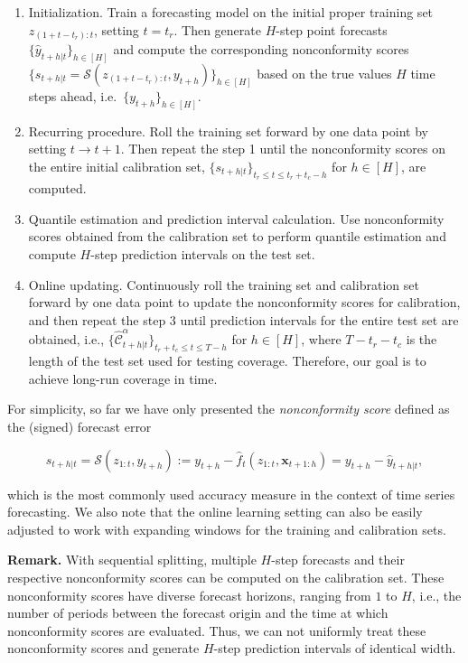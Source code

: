 \documentclass[
  11pt,
  a4paper,
]{article}
\theoremstyle{plain}
\theoremstyle{remark}
\begin{document}
\begin{enumerate}
\def\labelenumi{\arabic{enumi}.}
\item
  Initialization. Train a forecasting model on the initial proper
  training set \(z_{(1+t-t_r):t}\), setting \(t=t_r\). Then generate
  \(H\)-step point forecasts \(\{\hat{y}_{t+h|t}\}_{h\in[H]}\) and
  compute the corresponding nonconformity scores
  \(\{s_{t+h|t}=\mathcal{S}(z_{(1+t-t_r):t}, y_{t+h})\}_{h\in[H]}\)
  based on the true values \(H\) time steps ahead,
  i.e.~\(\{y_{t+h}\}_{h\in[H]}\).
\item
  Recurring procedure. Roll the training set forward by one data point
  by setting \(t \rightarrow t+1\). Then repeat the step 1 until the
  nonconformity scores on the entire initial calibration set,
  \(\{s_{t+h|t}\}_{t_r \leq t \leq t_r+t_c-h}\) for \(h\in[H]\), are
  computed.
\item
  Quantile estimation and prediction interval calculation. Use
  nonconformity scores obtained from the calibration set to perform
  quantile estimation and compute \(H\)-step prediction intervals on the
  test set.
\item
  Online updating. Continuously roll the training set and calibration
  set forward by one data point to update the nonconformity scores for
  calibration, and then repeat the step 3 until prediction intervals for
  the entire test set are obtained, i.e.,
  \(\{\hat{\mathcal{C}}_{t+h|t}^{\alpha}\}_{t_r+t_c \leq t \leq T-h}\)
  for \(h \in [H]\), where \(T-t_r-t_c\) is the length of the test set
  used for testing coverage. Therefore, our goal is to achieve long-run
  coverage in time.
\end{enumerate}

For simplicity, so far we have only presented the \emph{nonconformity
score} defined as the (signed) forecast error

\[
s_{t+h|t}=\mathcal{S}\left(z_{1:t}, y_{t+h}\right):=y_{t+h}-\hat{f}_t\left(z_{1:t},\bm{x}_{t+1:h}\right)=y_{t+h}-\hat{y}_{t+h|t},
\]

which is the most commonly used accuracy measure in the context of time
series forecasting. We also note that the online learning setting can
also be easily adjusted to work with expanding windows for the training
and calibration sets.

\textbf{Remark.} With sequential splitting, multiple \(H\)-step
forecasts and their respective nonconformity scores can be computed on
the calibration set. These nonconformity scores have diverse forecast
horizons, ranging from \(1\) to \(H\), i.e., the number of periods
between the forecast origin and the time at which nonconformity scores
are evaluated. Thus, we can not uniformly treat these nonconformity
scores and generate \(H\)-step prediction intervals of identical width.
\end{document}
